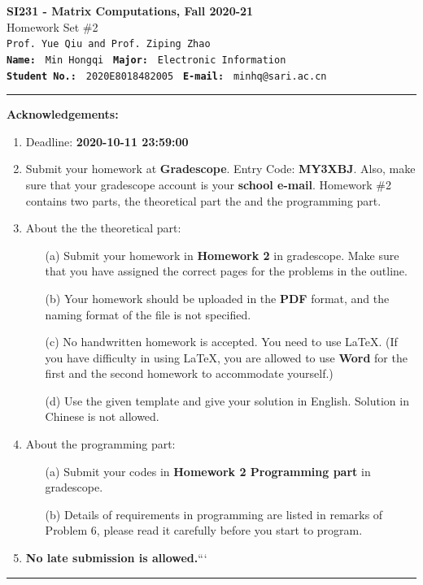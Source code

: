 \documentclass[english,onecolumn]{IEEEtran}
\begin{document}
\begin{center}
	\textbf{{\Large SI231 - Matrix Computations, Fall 2020-21}}\\
	Homework Set \#2\\
   \texttt{Prof. Yue Qiu and Prof. Ziping Zhao} \\
	\texttt{\textbf{Name:}}   	\texttt{ Min Hongqi }  		\hspace{1bp}
	\texttt{\textbf{Major:}}  	\texttt{ Electronic Information } 	\\
	\texttt{\textbf{Student No.:}} 	\texttt{ 2020E8018482005 }     \hspace{1bp}
	\texttt{\textbf{E-mail:}} 	\texttt{ minhq@sari.ac.cn}
\par\end{center}


\noindent
\rule{\linewidth}{0.4pt}
{\bf {\large Acknowledgements:}}
\begin{enumerate}
    \item Deadline: \textbf{2020-10-11 23:59:00}
    \item Submit your homework at \textbf{Gradescope}. Entry Code: \textbf{MY3XBJ}. Also, make sure that your gradescope account is your \textbf{school e-mail}.
    Homework \#2 contains two parts, the theoretical part the and the programming part.
    \item About the the theoretical part:
    \begin{enumerate}
            \item[(a)] Submit your homework in \textbf{Homework 2} in gradescope. Make sure that you have assigned the correct pages for the problems in the outline.
            \item[(b)] Your homework should be uploaded in the \textbf{PDF} format, and the naming format of the file is not specified.
            \item[(c)] No handwritten homework is accepted. You need to use \LaTeX. (If you have difficulty in using \LaTeX, you are allowed to use \textbf{Word} for the first and the second homework to accommodate yourself.)
            \item[(d)] Use the given template and give your solution in English. Solution in Chinese is not allowed. 
        \end{enumerate}
  \item About the programming part:
  \begin{enumerate}
      \item[(a)] Submit your codes in \textbf{Homework 2 Programming part} in gradescope.
      \item[(b)] Details of requirements in programming are listed in remarks of Problem 6, please read it carefully before you start to program.
  \end{enumerate}
  \item \textbf{No late submission is allowed.}```
\end{enumerate}
\rule{\linewidth}{0.4pt}
\newpage 
\end{document}
